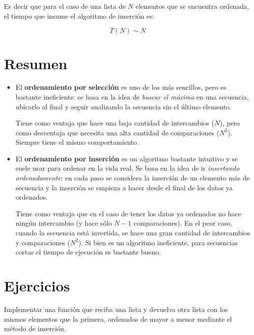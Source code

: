 Es decir que para el caso de una lista de $N$ elementos que se encuentra
ordenada, el tiempo que insume el algoritmo de inserción es:

\begin{equation}
T(N) \sim N
\end{equation}

\section{Resumen}

\begin{itemize}

\item El {\bf ordenamiento por selección} es uno de los más sencillos, pero es
bastante ineficiente: se basa en la idea de {\it buscar el máximo} en una secuencia,
ubicarlo al final y seguir analizando la secuencia sin el último elemento.

Tiene como ventaja que hace una baja cantidad de intercambios ($N$), pero
como desventaja que necesita una alta cantidad de comparaciones ($N^2$).
Siempre tiene el mismo comportamiento.

\item El {\bf ordenamiento por inserción} es un algoritmo bastante intuitivo y se
suele usar para ordenar en la vida real. Se basa en la idea de ir {\it insertando
ordenadamente}: en cada paso se considera la inserción de un elemento más de
secuencia y la inserción se empieza a hacer desde el final de los datos ya
ordenados.

Tiene como ventaja que en el caso de tener los datos ya ordenados no hace
ningún intercambio (y hace sólo $N-1$ comparaciones). En el peor caso, cuando
la secuencia está invertida, se hace una gran cantidad de intercambios y
comparaciones ($N^2$). Si bien es un algoritmo ineficiente, para secuencias
cortas el tiempo de ejecución es bastante bueno.

\end{itemize}

\newpage
\section{Ejercicios}

\begin{ejercicio}
Implementar una función que reciba una lista y devuelva otra lista con los
mismos elementos que la primera, ordenados de mayor a menor mediante el método
de inserción.
\end{ejercicio}

